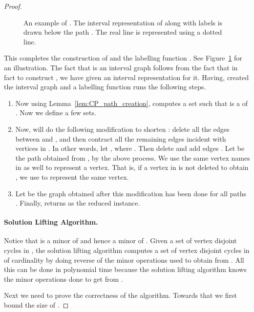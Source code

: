 \begin{proof}
\begin{figure}
\begin{tikzpicture}[ scale=1.3]
\end{tikzpicture}

\caption{An example of .  The interval representation of  along with labels is drawn below 
the path . The real line is represented using a dotted line.}
\label{figure_HP}
\end{figure}



This completes the construction of     and the labelling function
 .  
See Figure~\ref{figure_HP} for an illustration.  
The fact that   is an interval graph follows from the fact that in fact to construct  , we have given an interval representation for it. 
Having, created the interval graph and a labelling function  runs the following steps. 



\begin{enumerate}
\setlength{\itemsep}{-2pt}
\item Now using Lemma~\ref{lem:CP_path_creation},   computes 
a set  such that  is a \shortuli{} of . 
Now we define a few sets. 




\item Now,  will do the following modification to  shorten : delete all the edges between 
 and , and then contract all the remaining edges incident with vertices in . In other words, let , where . Then delete  and add edges . 
Let  be the path obtained from , by the above process. We use the same vertex names in  as well to represent a
vertex. That is, if a vertex  in  is not deleted to obtain , we use  to represent the same vertex. 
\item Let  be the graph obtained after this modification has been done for all paths . 
Finally,   returns  as the reduced instance. 
\end{enumerate}
\paragraph{Solution Lifting Algorithm.} 
Notice that  is a minor of  and hence a minor of .  Given a set  of vertex disjoint cycles in 
, the solution lifting algorithm computes a set  of vertex disjoint cycles in  of cardinality 
 by doing reverse of the minor operations used to obtain  from . All this can be done in polynomial time because  the solution lifting algorithm knows the 
minor operations done to get  from .    

Next we need to prove the correctness of the algorithm. Towards that we first bound the size of .  


\end{proof}
